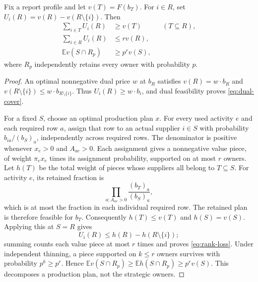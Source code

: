 \begin{lemma}\label{lem:owner-support}
Fix a report profile and let $v(T)=F(b_T)$. For $i\in R$, set
$U_i(R)=v(R)-v(R\setminus\{i\})$. Then
\begin{align}
 \sum_{i\in T}U_i(R)&\ge v(T) &&(T\subseteq R),\label{eq:dual-cover}\\
 \sum_{i\in R}U_i(R)&\le r v(R),\label{eq:rank-loss}\\
 \mathbb E v(S\cap R_p)&\ge p^r v(S),\label{eq:thinning}
\end{align}
where $R_p$ independently retains every owner with probability $p$.
\end{lemma}
\begin{proof}
An optimal nonnegative dual price $w$ at $b_R$ satisfies
$v(R)=w\cdot b_R$ and $v(R\setminus\{i\})\le w\cdot b_{R\setminus\{i\}}$.
Thus $U_i(R)\ge w\cdot b_i$, and dual feasibility proves
\eqref{eq:dual-cover}.

For a fixed $S$, choose an optimal production plan $x$. For every used
activity $e$ and each required row $a$, assign that row to an actual supplier
$i\in S$ with probability $b_{ia}/(b_S)_a$, independently across required
rows. The denominator is positive whenever $x_e>0$ and $A_{ae}>0$.
Each assignment gives a nonnegative value piece, of weight
$\pi_e x_e$ times its assignment probability, supported on at most $r$ owners.
Let $h(T)$ be the total weight of pieces whose suppliers all belong to
$T\subseteq S$. For activity $e$, its retained fraction is
\[
 \prod_{a:A_{ae}>0}\frac{(b_T)_a}{(b_S)_a},
\]
which is at most the fraction in each individual required row. The retained
plan is therefore feasible for $b_T$. Consequently $h(T)\le v(T)$ and
$h(S)=v(S)$. Applying this at $S=R$ gives
\[
 U_i(R)\le h(R)-h(R\setminus\{i\});
\]
summing counts each value piece at most $r$ times and proves
\eqref{eq:rank-loss}. Under independent thinning, a piece supported on $k\le r$
owners survives with probability $p^k\ge p^r$. Hence
$\mathbb E v(S\cap R_p)\ge\mathbb E h(S\cap R_p)\ge p^r v(S)$.
This decomposes a production plan, not the strategic owners.
\end{proof}


